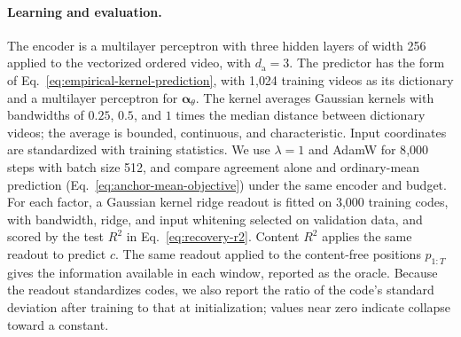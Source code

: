 \paragraph{Learning and evaluation.}
The encoder is a multilayer perceptron with three hidden layers of width
256 applied to the vectorized ordered video, with $d_{\mathrm a}=3$.
The predictor has the form of Eq.~\ref{eq:empirical-kernel-prediction},
with 1{,}024 training videos as its dictionary and a multilayer perceptron
for $\boldsymbol\alpha_\theta$. The kernel averages Gaussian kernels with
bandwidths of $0.25$, $0.5$, and $1$ times the median distance between
dictionary videos; the average is bounded, continuous, and characteristic.
Input coordinates are standardized with training statistics. We use
$\lambda=1$ and AdamW for 8{,}000 steps with batch size 512, and compare
agreement alone and ordinary-mean prediction
(Eq.~\ref{eq:anchor-mean-objective}) under the same encoder and budget.
For each factor, a Gaussian kernel ridge readout is fitted on 3{,}000
training codes, with bandwidth, ridge, and input whitening selected on
validation data, and scored by the test $R^2$ in
Eq.~\ref{eq:recovery-r2}. Content $R^2$ applies the same readout to
predict $c$. The same readout applied to the content-free positions
$p_{1:T}$ gives the information available in each window, reported as the
oracle. Because the readout standardizes codes, we also report the ratio
of the code's standard deviation after training to that at
initialization; values near zero indicate collapse toward a constant.

